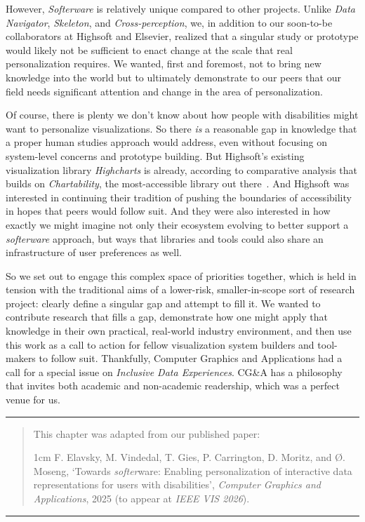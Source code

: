 \documentclass[12pt]{cmuthesis}
\begin{document}
However, \textit{Softerware} is relatively unique compared to other projects. Unlike \textit{Data Navigator}, \textit{Skeleton}, and \textit{Cross-perception}, we, in addition to our soon-to-be collaborators at Highsoft and Elsevier, realized that a singular study or prototype would likely not be sufficient to enact change at the scale that real personalization requires. We wanted, first and foremost, not to bring new knowledge into the world but to ultimately demonstrate to our peers that our field needs significant attention and change in the area of personalization.

Of course, there is plenty we don't know about how people with disabilities might want to personalize visualizations. So there \textit{is} a reasonable gap in knowledge that a proper human studies approach would address, even without focusing on system-level concerns and prototype building. But Highsoft's existing visualization library \textit{Highcharts} is already, according to comparative analysis that builds on \textit{Chartability}, the most-accessible library out there~\cite{Kim2023Beyond}. And Highsoft was interested in continuing their tradition of pushing the boundaries of accessibility in hopes that peers would follow suit. And they were also interested in how exactly we might imagine not only their ecosystem evolving to better support a \textit{softerware} approach, but ways that libraries and tools could also share an infrastructure of user preferences as well.

So we set out to engage this complex space of priorities together, which is held in tension with the traditional aims of a lower-risk, smaller-in-scope sort of research project: clearly define a singular gap and attempt to fill it. We wanted to contribute research that fills a gap, demonstrate how one might apply that knowledge in their own practical, real-world industry environment, and then use this work as a call to action for fellow visualization system builders and tool-makers to follow suit. Thankfully, Computer Graphics and Applications had a call for a special issue on \textit{Inclusive Data Experiences}. CG\&A has a philosophy that invites both academic and non-academic readership, which was a perfect venue for us.

\newpage

\noindent\rule{16cm}{0.4pt}
\begin{quote}
This chapter was adapted from our published paper:
\begin{adjustwidth}{1cm}{}
F. Elavsky, M. Vindedal, T. Gies, P. Carrington, D. Moritz, and Ø. Moseng, ‘Towards \textit{softer}ware: Enabling personalization of interactive data representations for users with disabilities’, \textit{Computer Graphics and Applications}, 2025 (to appear at \textit{IEEE VIS 2026}).
\end{adjustwidth}
\end{quote}
\noindent\rule{16cm}{0.4pt}
\end{document}
